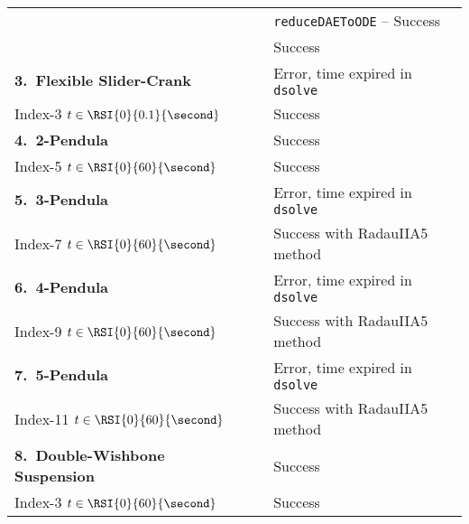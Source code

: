 {\begin{longtable}{lccl}
    &                            & \mycheckmark{}\phantom{\mywarnmark{}} & \texttt{reduceDAEToODE} -- Success \\ \cmidrule{2-4}\cmidrule{2-4}
    & \Indigo{} & \mycheckmark{}\phantom{\mywarnmark{}} & Success \\ \midrule
  \multirow{1}{*}{\textbf{3.~Flexible Slider-Crank}} %
    & \Maple{}  & \mycrossmark{}\phantom{\mywarnmark{}} & Error, time expired in \texttt{dsolve} \\ \cmidrule{2-4}
    Index-3 \quad $t \in \RSI{0}{0.1}{\second}$ & \Indigo{} & \mycheckmark{}\phantom{\mywarnmark{}} & Success \\ \midrule
  \multirow{1}{*}{\textbf{4.~2-Pendula}} %
    & \Maple{}  & \mycheckmark{}\phantom{\mywarnmark{}} & Success \\ \cmidrule{2-4}
    Index-5 \quad $t \in \RSI{0}{60}{\second}$ & \Indigo{} & \mycheckmark{}\phantom{\mywarnmark{}} & Success \\ \midrule
  \multirow{1}{*}{\textbf{5.~3-Pendula}} %
    & \Maple{}  & \mycrossmark{}\phantom{\mywarnmark{}} & Error, time expired in \texttt{dsolve} \\ \cmidrule{2-4}
    Index-7 \quad $t \in \RSI{0}{60}{\second}$ & \Indigo{} & \mycheckmark{}\mywarnmark{} & Success with RadauIIA5 method \\ \midrule
  \multirow{1}{*}{\textbf{6.~4-Pendula}} %
    & \Maple{}  & \mycrossmark{}\phantom{\mywarnmark{}} & Error, time expired in \texttt{dsolve} \\ \cmidrule{2-4}
    Index-9 \quad $t \in \RSI{0}{60}{\second}$ & \Indigo{} & \mycheckmark{}\mywarnmark{} & Success with RadauIIA5 method \\ \midrule
  \multirow{1}{*}{\textbf{7.~5-Pendula}} %
    & \Maple{}  & \mycrossmark{}\phantom{\mywarnmark{}} & Error, time expired in \texttt{dsolve} \\ \cmidrule{2-4}
    Index-11 \quad $t \in \RSI{0}{60}{\second}$ & \Indigo{} & \mycheckmark{}\mywarnmark{} & Success with RadauIIA5 method \\ \midrule
  \multirow{1}{*}{\textbf{8.~Double-Wishbone Suspension}} %
    & \Maple{}  & \mycheckmark{}\phantom{\mywarnmark{}} & Success \\ \cmidrule{2-4}
    Index-3 \quad $t \in \RSI{0}{60}{\second}$ & \Indigo{} & \mycheckmark{}\phantom{\mywarnmark{}} & Success \\ \midrule

\end{longtable}}
